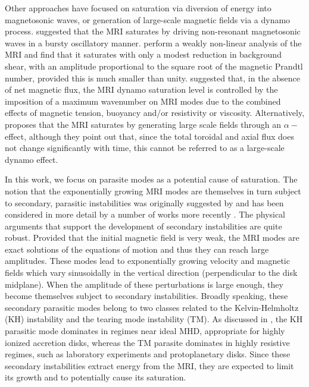 \documentclass[]{emulateapj}
\begin{document}
Other approaches have focused on saturation via diversion of energy
into magnetosonic waves, or generation of large-scale
magnetic fields via a dynamo process.  \citet{2012PhRvL.109v4501L}
suggested that the MRI saturates by driving non-resonant magnetosonic
waves in a bursty oscillatory manner.  \citet{Umurhan:2007hs} perform
a weakly non-linear analysis of the MRI and find that it saturates with only
a modest reduction in background shear, with an amplitude proportional
to the square root of the magnetic Prandtl number, provided this is much
smaller than unity. \citet{Vishniac:2009il} suggested that, in the
absence of net magnetic flux, the MRI dynamo saturation level is
controlled by the imposition of a maximum wavenumber on MRI modes due
to the combined effects of magnetic tension, buoyancy and/or
resistivity or viscosity. Alternatively, \citet{Ebrahimi:2009ey} 
proposes that the MRI saturates by generating large scale fields 
through an $\alpha-$effect, although they point out that, since the total toroidal 
and axial flux does not change significantly with time, this cannot be referred 
to as a large-scale dynamo effect. 

In this work, we focus on parasite modes as a potential cause of saturation.  
The notion that the exponentially growing MRI modes are themselves in turn 
subject to secondary, parasitic instabilities was originally suggested by \citet{Goodman:1994dd} 
and has been considered in more detail by a number of works more recently
\citep{2008A&A...487....1B,Obergaulinger:2009fv,Pessah:2009gm,Latter:2009br,Pessah:2010ic}.
The physical arguments that support the development of secondary instabilities
are quite robust. Provided that the initial magnetic field is very weak, 
the MRI modes are exact solutions of the equations of motion and thus they can 
reach large amplitudes. These modes lead to exponentially growing velocity and
magnetic fields which vary sinusoidally in the vertical direction (perpendicular to the
disk midplane). When the amplitude of these perturbations is large enough, they 
become themselves subject to secondary instabilities. 
Broadly speaking, these secondary parasitic modes belong to two classes
related to the Kelvin-Helmholtz (KH) instability and the tearing mode
instability (TM). As discussed in \citet{Pessah:2010ic}, the KH
parasitic mode dominates in regimes near ideal MHD, appropriate for
highly ionized accretion disks, whereas the TM parasite dominates in
highly resistive regimes, such as laboratory experiments and
protoplanetary disks.  Since these secondary instabilities extract
energy from the MRI, they are expected to limit its growth and to
potentially cause its saturation.
\end{document}
